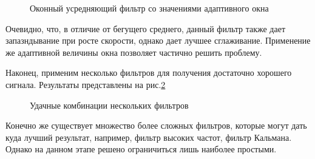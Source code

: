 \documentclass[14pt,a4paper,russian]{scrartcl}
\begin{document}
\begin{figure}[h!]
    \caption{Оконный усредняющий фильтр со значениями адаптивного окна}
    \label{fig:window_average_adaptive}
\end{figure}

Очевидно, что, в отличие от бегущего среднего, данный фильтр также дает запазндывание при росте
скорости, однако дает лучшее сглаживание. Применение же адаптивной величины окна
позволяет частично решить проблему.

Наконец, применим несколько фильтров для получения достаточно хорошего сигнала.
Результаты представлены на рис.\ref{fig:combined_filters}
\begin{figure}[h!]
    \caption{Удачные комбинации нескольких фильтров}
    \label{fig:combined_filters}
\end{figure}

Конечно же существует множество более сложных фильтров, которые могут
дать куда лучший результат, например, фильтр высоких частот, 
фильтр Кальмана. Однако на данном этапе решено ограничиться лишь наиболее простыми.
\end{document}
